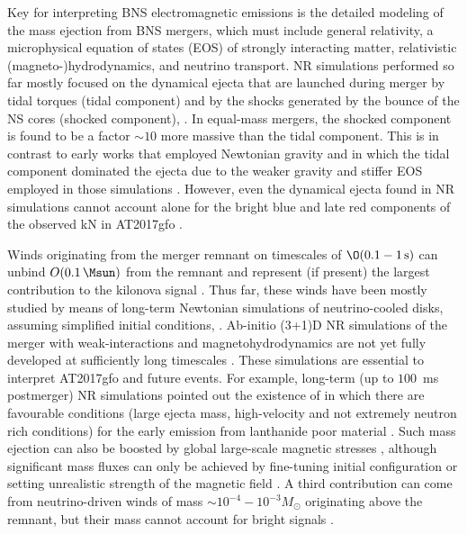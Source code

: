 Key for interpreting BNS electromagnetic emissions is the detailed modeling of
the mass ejection from BNS mergers, which must include general
relativity, a microphysical equation of states (EOS) of strongly interacting
matter, relativistic (magneto-)hydrodynamics, and neutrino
transport. NR simulations performed so far
mostly focused on the dynamical ejecta that are launched during merger
by tidal torques (tidal component) and by the shocks generated by the
bounce of the NS cores (shocked component),
\citep[\eg][]{Hotokezaka:2013iia,Bauswein:2013yna,Wanajo:2014wha,Sekiguchi:2015dma,Radice:2016dwd,Sekiguchi:2016bjd,Radice:2018pdn,Vincent:2019kor}. In
equal-mass mergers, the shocked component is found to be a factor
${\sim}10$ more massive than the tidal component. This is in
contrast to early works that employed Newtonian gravity and in which
the tidal component dominated the ejecta due to the weaker gravity and
stiffer EOS employed in those simulations
\citep{Ruffert:1996by,Rosswog:1998hy,Rosswog:2001fh,Rosswog:2003rv,Rosswog:2003tn,Rosswog:2003ts,Oechslin:2006uk,Rosswog:2013kqa,Korobkin:2012uy}.
However, even the dynamical ejecta found in NR simulations cannot account alone for the
bright blue and late red components of the observed kN in AT2017gfo \citep{Siegel:2019mlp}.

Winds originating from the merger remnant on timescales of
$\O(0.1-1\,{\rm s})$ can unbind $O(0.1\, \Msun)$ from the remnant and
represent (if present) the largest contribution to the kilonova signal
\citep{Dessart:2008zd,Fernandez:2014bra,Just:2014fka,Lippuner:2017bfm,Siegel:2017nub,Fujibayashi:2017puw,Radice:2018xqa,Fernandez:2018kax,Janiuk:2019rrt,Miller:2019dpt,Fujibayashi:2020qda,Mosta:2020hlh}.
Thus far, these winds have been mostly studied by means of long-term
Newtonian simulations of neutrino-cooled disks, assuming simplified
initial conditions, \citep[\eg]{Metzger:2008av,Beloborodov:2008nx,Lee:2009uc,Fernandez:2012kh}.
Ab-initio (3+1)D NR simulations of the merger with weak-interactions and
magnetohydrodynamics are not yet fully developed at sufficiently long timescales \citep{Sekiguchi:2011zd,Wanajo:2014wha,Sekiguchi:2015dma,Palenzuela:2015dqa,Radice:2016dwd,Lehner:2016lxy,Sekiguchi:2016bjd,Foucart:2016vxd,Bovard:2017mvn,Fujibayashi:2017puw,Fujibayashi:2017xsz,Radice:2018xqa,Nedora:2019jhl,Vincent:2019kor,Bernuzzi:2020txg}.
These simulations are essential to interpret AT2017gfo and future events.
For example, long-term (up to $100$~ms postmerger) NR simulations 
pointed out the existence of \swind{} in which there are
favourable conditions (large ejecta mass, high-velocity and not extremely neutron rich conditions) 
for the early emission from lanthanide poor material \citep{Nedora:2019jhl}.
Such mass ejection can also be boosted by global large-scale magnetic
stresses \citep{Metzger:2018uni,Siegel:2017jug,Siegel:2017nub},
although significant mass fluxes can only be achieved by fine-tuning
initial configuration or setting unrealistic strength of the magnetic
field \citep[\eg][]{Ciolfi:2020hgg,Mosta:2020hlh}.
A third contribution can come from neutrino-driven winds of mass ${\sim} 10^{-4}-10^{-3}M_{\odot}$ originating above the remnant, 
but their mass cannot account for bright signals \citep{Dessart:2008zd,Perego:2014fma,Just:2014fka}.

